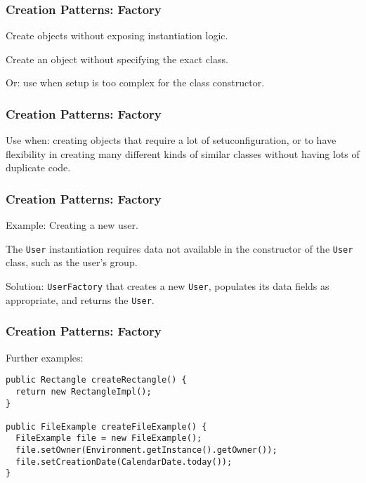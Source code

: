 \begin{frame}
\frametitle{Creation Patterns: Factory}

\begin{changemargin}{1cm}
Create objects without exposing instantiation logic.

Create an object without specifying the exact class.

Or: use when setup is too complex for the class constructor.

\end{changemargin}
\end{frame}

\begin{frame}
\frametitle{Creation Patterns: Factory}

\begin{changemargin}{1cm}

Use when: creating objects that require a lot of setuconfiguration, or to have flexibility in creating many different kinds of similar classes without having lots of duplicate code.

\end{changemargin}
\end{frame}

\begin{frame}
\frametitle{Creation Patterns: Factory}

\begin{changemargin}{1cm}
Example: Creating a new user. 

The \texttt{User} instantiation requires data not available in the constructor of the \texttt{User} class, such as the user's group.

Solution: \texttt{UserFactory} that creates a new \texttt{User}, populates its data fields as appropriate, and returns the \texttt{User}.

\end{changemargin}
\end{frame}

\begin{frame}[fragile]
\frametitle{Creation Patterns: Factory}
\begin{changemargin}{1cm}
Further examples:

\begin{verbatim}
public Rectangle createRectangle() {
  return new RectangleImpl();
}

public FileExample createFileExample() {
  FileExample file = new FileExample();
  file.setOwner(Environment.getInstance().getOwner());
  file.setCreationDate(CalendarDate.today());
}

\end{verbatim}
\end{changemargin}
\end{frame}


